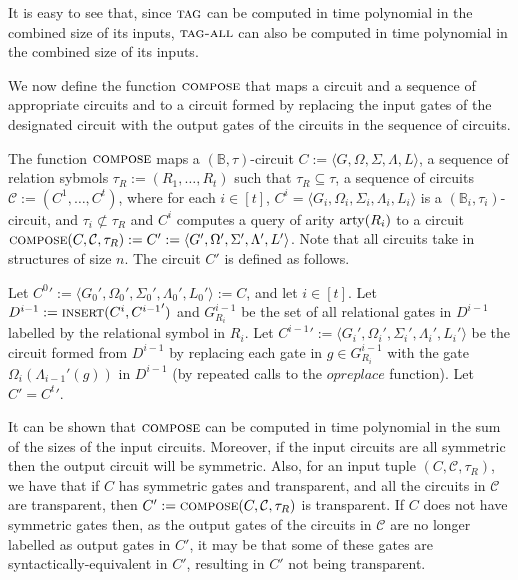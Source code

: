 \documentclass[../paper.tex]{subfiles}
\begin{document}
It is easy to see that, since ${\normalfont\textsc{tag}}$ can be computed in time polynomial in
the combined size of its inputs, ${\normalfont\textsc{tag-all}}$ can also be computed in time
polynomial in the combined size of its inputs.

We now define the function ${\normalfont\textsc{compose}}$ that maps a circuit and a sequence of
appropriate circuits and to a circuit formed by replacing the input gates of the
designated circuit with the output gates of the circuits in the sequence of
circuits.

\begin{definition}
  The function ${\normalfont\textsc{compose}}$ maps a $(\mathbb{B}, \tau)$-circuit $C := \langle
  G, \Omega, \Sigma, \Lambda, L \rangle$, a sequence of relation sybmols $\tau_R
  := (R_1, \ldots, R_t)$ such that $\tau_R \subseteq \tau$, a sequence of
  circuits $\mathcal{C} := ( C^1, \ldots, C^t)$, where for each $i \in [t]$,
  $C^i = \langle G_i, \Omega_i, \Sigma_i, \Lambda_i, L_i \rangle$ is a
  $(\mathbb{B}_i, \tau_i)$-circuit, and $\tau_i \not\subset \tau_R$ and $C^i$
  computes a query of arity $\mathrm{arty}(R_i)$ to a circuit ${\normalfont\textsc{compose}}(C,
  \mathcal{C}, \tau_R) := C' := \langle G', \Omega', \Sigma', \Lambda', L'
  \rangle$. Note that all circuits take in structures of size $n$. The circuit
  $C'$ is defined as follows.
  
  Let ${C^0}' := \langle G_0', \Omega_0', \Sigma_0', \Lambda_0', L_0' \rangle :=
  C$, and let $i \in [t]$. Let $D^{i-1}:= {\normalfont\textsc{insert}} (C^i, {C^{i-1}}')$ and
  $G^{i-1}_{R_i}$ be the set of all relational gates in $D^{i-1}$ labelled by
  the relational symbol in $R_i$. Let ${C^{i-1}}' := \langle G_i', \Omega_i',
  \Sigma_i', \Lambda_i', L_i' \rangle$ be the circuit formed from $D^{i-1}$ by
  replacing each gate in $g \in G^{i-1}_{R_i}$ with the gate
  $\Omega_{i}(\Lambda_{i-1}'(g))$ in $D^{i-1}$ (by repeated calls to the
  $op{replace}$ function). Let $C' = {C^{t}}'$.
\end{definition}

It can be shown that ${\normalfont\textsc{compose}}$ can be computed in time polynomial in the
sum of the sizes of the input circuits. Moreover, if the input circuits are all
symmetric then the output circuit will be symmetric. Also, for an input tuple
$(C, \mathcal{C}, \tau_R)$, we have that if $C$ has symmetric gates and
transparent, and all the circuits in $\mathcal{C}$ are transparent, then $C' :=
{\normalfont\textsc{compose}}(C, \mathcal{C}, \tau_R)$ is transparent. If $C$ does not have
symmetric gates then, as the output gates of the circuits in $\mathcal{C}$ are
no longer labelled as output gates in $C'$, it may be that some of these gates
are syntactically-equivalent in $C'$, resulting in $C'$ not being transparent.
\end{document}
